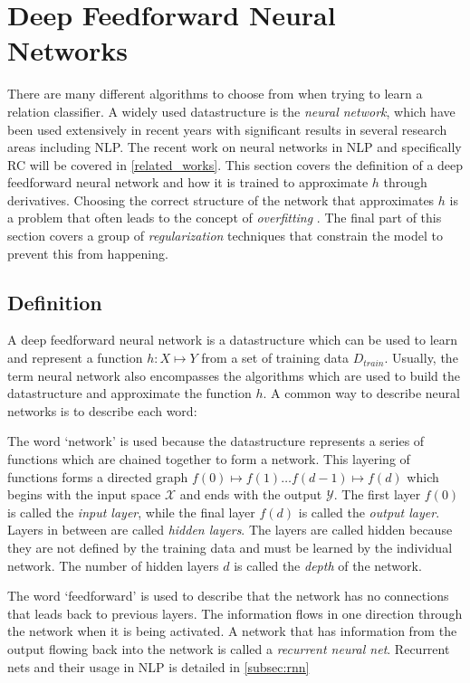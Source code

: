\section{Deep Feedforward Neural Networks}
\label{sec:neural_networks}

There are many different algorithms to choose from when trying to learn a relation classifier. A widely used datastructure is the \emph{neural network}, which have been used extensively in recent years with significant results in several research areas including NLP. The recent work on neural networks in NLP and specifically RC will be covered in \autoref{related_works}. This section covers the definition of a deep feedforward neural network and how it is trained to approximate $h$ through derivatives. Choosing the correct structure of the network that approximates $h$ is a problem that often leads to the concept of \emph{overfitting} \citep[sec. 5.2]{dlbook}. The final part of this section covers a group of \emph{regularization} techniques that constrain the model to prevent this from happening. 

\subsection{Definition}

A deep feedforward neural network is a datastructure which can be used to learn and represent a function $h:X \mapsto Y$ from a set of training data $D_{train}$. Usually, the term neural network also encompasses the algorithms which are used to build the datastructure and approximate the function $h$. A common way to describe neural networks is to describe each word:

The word `network' is used because the datastructure represents a series of functions which are chained together to form a network. This layering of functions forms a directed graph $f(0) \mapsto f(1) \ldots f(d-1) \mapsto f(d)$ which begins with the input space $\mathcal{X}$ and ends with the output $\mathcal{Y}$.  
The first layer $f(0)$ is called the \emph{input layer}, while the final layer $f(d)$ is called the \emph{output layer}. Layers in between are called \emph{hidden layers}. The layers are called hidden because they are not defined by the training data and must be learned by the individual network\citep[chapter 6]{dl_book}. The number of hidden layers $d$ is called the \emph{depth} of the network.  

The word `feedforward' is used to describe that the network has no connections that leads back to previous layers. The information flows in one direction through the network when it is being activated. A network that has information from the output flowing back into the network is called a \emph{recurrent neural net}. Recurrent nets and their usage in NLP is detailed in \autoref{subsec:rnn}  

